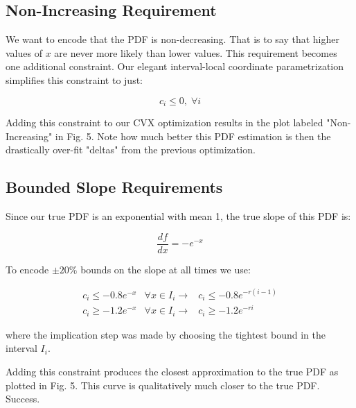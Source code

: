 \documentclass[a4paper]{article}
\begin{document}
\subsection{Non-Increasing Requirement}
We want to encode that the PDF is non-decreasing.
That is to say that higher values of $x$ are never more likely than lower values.
This requirement becomes one additional constraint.
Our elegant interval-local coordinate parametrization simplifies this constraint to just:

\begin{equation}
  c_i \leq 0 , \; \forall i
\end{equation}

Adding this constraint to our CVX optimization results in the plot labeled "Non-Increasing" in Fig. 5.
Note how much better this PDF estimation is then the drastically over-fit "deltas" from the previous optimization.

\subsection{Bounded Slope Requirements}
Since our true PDF is an exponential with mean 1, the true slope of this PDF is:

$$
\frac{df}{dx} = -e^{-x}
$$

To encode $\pm 20\%$ bounds on the slope at all times we use:

\begin{equation}
  \begin{aligned}
    c_i \leq -0.8 e^{-x} & \forall x \in I_i \rightarrow & c_i \leq -0.8 e^{-r(i-1)} \\
    c_i \geq -1.2 e^{-x} & \forall x \in I_i \rightarrow & c_i \geq -1.2 e^{-ri}
  \end{aligned}
\end{equation}

where the implication step was made by choosing the tightest bound in the interval $I_i$.

Adding this constraint produces the closest approximation to the true PDF as plotted in Fig. 5.
This curve is qualitatively much closer to the true PDF. Success.
\end{document}

